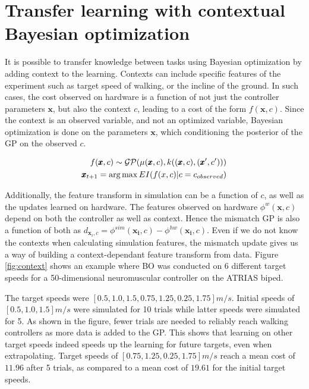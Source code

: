 \section{Transfer learning with contextual Bayesian optimization}


It is possible to transfer knowledge between tasks using Bayesian optimization by adding context to the learning. Contexts can include specific features of the experiment such as target speed of walking, or the incline of the ground. In such cases, the cost observed on hardware is a function of not just the controller parameters $\pmb{x}$, but also the context $c$, leading to a cost of the form $f(\pmb{x},c)$. Since the context is an observed variable, and not an optimized variable, Bayesian optimization is done on the parameters $\pmb{x}$, which conditioning the posterior of the GP on the observed $c$.

\begin{align}
    f(\pmb{x},c) \sim \mathcal{GP}(\mu(\pmb{x}, c), k((\pmb{x},c),(\pmb{x}',c'))) \\
    \pmb{x}_{t+1} = \operatorname*{arg\,max} EI(f(x,c)|c=c_{observed})
\end{align}

Additionally, the feature transform in simulation can be a function of $c$, as well as the updates learned on hardware. The features observed on hardware $\phi^{w}(\pmb{x}, c)$ depend on both the controller as well as context. Hence the mismatch GP is also a function of both as $d_{\pmb{x}_i, c} = \phi^{sim}(\pmb{x_i},c)- \phi^{hw}(\pmb{x_i},c)$. Even if we do not know the contexts when calculating simulation features, the mismatch update gives us a way of building a context-dependant feature transform from data. Figure \ref{fig:context} shows an example where BO was conducted on 6 different target speeds for a 50-dimensional neuromuscular controller on the ATRIAS biped. 


The target speeds were $[0.5, 1.0, 1.5, 0.75, 1.25, 0.25, 1.75] m/s$. Initial speeds of $[0.5, 1.0, 1.5]m/s$ were simulated for 10 trials while latter speeds were simulated for 5. 
As shown in the figure, fewer trials are needed to reliably reach walking controllers as more data is added to the GP. This shows that learning on other target speeds indeed speeds up the learning for future targets, even when extrapolating. Target speeds of  $[0.75, 1.25, 0.25, 1.75] m/s$ reach a mean cost of $11.96$ after 5 trials, as compared to a mean cost of $19.61$ for the initial target speeds.

